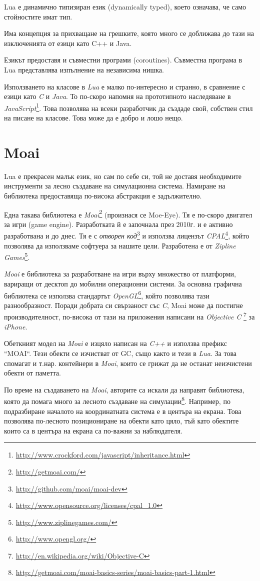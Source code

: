 			Lua е динамично типизиран език (dynamically typed), което означава, че само стойностите имат тип.			
			
			Има концепция за прихващане на грешките, която много се доближава до тази на изключенията от езици като
			C++ и Java.
			
			Езикът предоставя и съвместни програми (coroutines). Съвместна програма в Lua представлява изпълнение на независима нишка.		
			
			Използването на класове в \emph{Lua} е малко по-интересно и странно, в сравнение с езици като \emph{C} и \emph{Java}. 
			То по-скоро напомня на прототипното наследяване в
			\emph{JavaScript}\footnote{\url{http://www.crockford.com/javascript/inheritance.html}}.
			Това позволява на всеки разработчик да създаде свой, собствен стил на писане на класове. Това може да е добро и лошо нещо.			
	
	\section{Moai}
	
		Lua е прекрасен малък език, но сам по себе си, той не доставя необходимите инструменти
		за лесно създаване на симулационна система. Намиране на библиотека предоставяща по-висока
		абстракция е задължително.
		
		Една такава библиотека е \emph{Moai}\footnote{\url{http://getmoai.com/}} (произнася се Moe-Eye).
		Тя е по-скоро двигател за игри (game engine).
		Разработката й е започнала през 2010г. и е активно разработвана и до днес. 
		Тя е с \emph{отворен код}\footnote{\url{http://github.com/moai/moai-dev}}
		и използва лицензът \emph{CPAL}\footnote{\url{http://www.opensource.org/licenses/cpal_1.0}}, който
		позволява да използваме софтуера за нашите цели. 
		Разработена е от \emph{Zipline Games}\footnote{\url{http://www.ziplinegames.com/}}.						
		
		\emph{Moai} е библиотека за разработване на игри върху множество от платформи, вариращи от десктоп до
		мобилни операционни системи. За основна графична библиотека се използва стандартът 
		\emph{OpenGL}\footnote{\url{http://www.opengl.org/}}, който позволява тази разнообразност.
		Поради добрата си свързаност със \emph{C}, Moai може да постигне производителност, по-висока
		от тази на приложения написани на  \emph{Objective C}
		\footnote{\url{http://en.wikipedia.org/wiki/Objective-C}} за \emph{iPhone}.

			Обеткният модел на \emph{Moai} е изцяло написан на \emph{C++} и използва префикс ``MOAI``. Тези обекти
		се изчистват от \ac{GC}, също както и тези в \emph{Lua}. За това спомагат и т.нар. контейнери в \emph{Moai},
		които се грижат да не останат неизчистени обекти от паметта.
		
		По време на създаването на \emph{Moai}, авторите са искали да направят библиотека, която да помага много
		за лесното създаване на симулации\footnote{\url{http://getmoai.com/moai-basics-series/moai-basics-part-1.html}}.
		Например, по подразбиране началото на координатната система е в центъра на екрана. Това позволява по-лесното
		позициониране на обекти като цяло, тъй като обектите които са в центъра на екрана са по-важни за наблюдателя.			